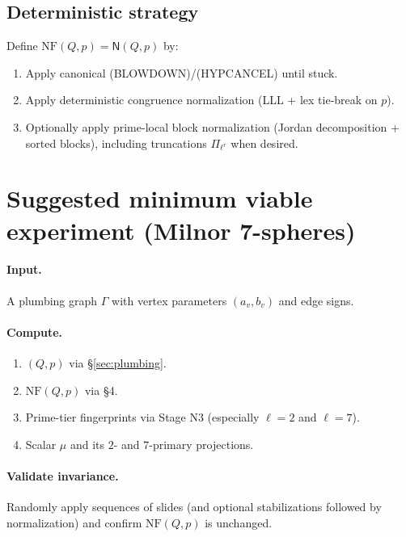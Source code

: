 \documentclass[11pt]{article}
\newcommand{\NF}{\mathrm{NF}}
\newcommand{\Rule}[1]{\textsc{(#1)}}
\begin{document}
\subsection{Deterministic strategy}
Define $\NF(Q,p)=\mathsf N(Q,p)$ by:
\begin{enumerate}[label=\arabic*.]
\item Apply canonical \Rule{BLOWDOWN}/\Rule{HYPCANCEL} until stuck.
\item Apply deterministic congruence normalization (LLL + lex tie-break on $p$).
\item Optionally apply prime-local block normalization (Jordan decomposition + sorted blocks), including truncations $\Pi_{\ell^r}$ when desired.
\end{enumerate}

\section{Suggested minimum viable experiment (Milnor 7-spheres)}
\paragraph{Input.} A plumbing graph $\Gamma$ with vertex parameters $(a_v,b_v)$ and edge signs.

\paragraph{Compute.}
\begin{enumerate}[label=\arabic*.]
\item $(Q,p)$ via \S\ref{sec:plumbing}.
\item $\NF(Q,p)$ via \S4.
\item Prime-tier fingerprints via Stage N3 (especially $\ell=2$ and $\ell=7$).
\item Scalar $\mu$ and its $2$- and $7$-primary projections.
\end{enumerate}

\paragraph{Validate invariance.}
Randomly apply sequences of slides (and optional stabilizations followed by normalization) and confirm $\NF(Q,p)$ is unchanged.

\end{document}
